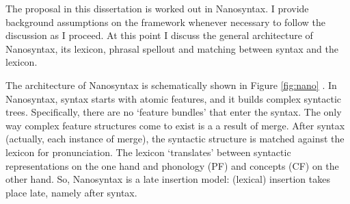 


The proposal in this dissertation is worked out in Nanosyntax. I provide background assumptions on the framework whenever necessary to follow the discussion as I proceed. At this point I discuss the general architecture of Nanosyntax, its lexicon, phrasal spellout and matching between syntax and the lexicon.

The architecture of Nanosyntax is schematically shown in Figure \ref{fig:nano} \citep[from][]{vandenwyngaerd2020,caha2019}. In Nanosyntax, syntax starts with atomic features, and it builds complex syntactic trees. Specifically, there are no `feature bundles' that enter the syntax. The only way complex feature structures come to exist is a a result of merge.
After syntax (actually, each instance of merge), the syntactic structure is matched against the lexicon for pronunciation. The lexicon `translates' between syntactic representations on the one hand and phonology (PF) and concepts (CF) on the other hand. So, Nanosyntax is a late insertion model: (lexical) insertion takes place late, namely after syntax.

